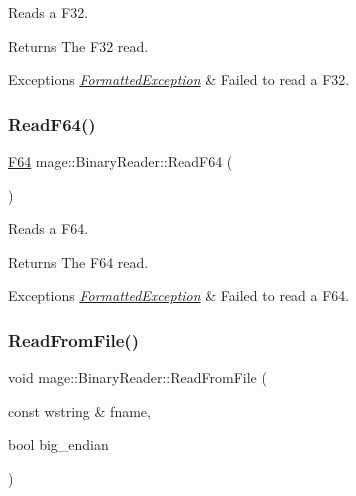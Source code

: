 Reads a {\ttfamily F32}.

\begin{DoxyReturn}{Returns}
The {\ttfamily F32} read. 
\end{DoxyReturn}

\begin{DoxyExceptions}{Exceptions}
{\em \hyperlink{classmage_1_1_formatted_exception}{Formatted\+Exception}} & Failed to read a {\ttfamily F32}. \\
\hline
\end{DoxyExceptions}
\hypertarget{classmage_1_1_binary_reader_a37887a659040c4a3b495eef9376352d0}{}\label{classmage_1_1_binary_reader_a37887a659040c4a3b495eef9376352d0} 
\subsubsection{\texorpdfstring{Read\+F64()}{ReadF64()}}
{\footnotesize\ttfamily \hyperlink{namespacemage_ad26233bbec640deda836e572c1a23708}{F64} mage\+::\+Binary\+Reader\+::\+Read\+F64 (\begin{DoxyParamCaption}{ }\end{DoxyParamCaption})\hspace{0.3cm}{\ttfamily [protected]}}

Reads a {\ttfamily F64}.

\begin{DoxyReturn}{Returns}
The {\ttfamily F64} read. 
\end{DoxyReturn}

\begin{DoxyExceptions}{Exceptions}
{\em \hyperlink{classmage_1_1_formatted_exception}{Formatted\+Exception}} & Failed to read a {\ttfamily F64}. \\
\hline
\end{DoxyExceptions}
\hypertarget{classmage_1_1_binary_reader_aa9cc5e2bd41cd5ae5ee421ee9a1e10b2}{}\label{classmage_1_1_binary_reader_aa9cc5e2bd41cd5ae5ee421ee9a1e10b2} 
\subsubsection{\texorpdfstring{Read\+From\+File()}{ReadFromFile()}}
{\footnotesize\ttfamily void mage\+::\+Binary\+Reader\+::\+Read\+From\+File (\begin{DoxyParamCaption}\item[{const wstring \&}]{fname,  }\item[{bool}]{big\+\_\+endian }\end{DoxyParamCaption})}

